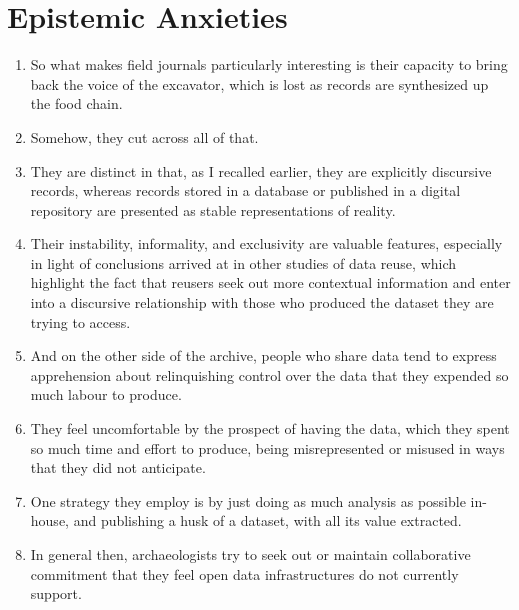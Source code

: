 \documentclass[12pt]{article}
\begin{document}
\section{Epistemic Anxieties}
\begin{enumerate}
  \item So what makes field journals particularly interesting is their capacity to bring back the voice of the excavator, which is lost as records are synthesized up the food chain.
  \item Somehow, they cut across all of that.
  \item They are distinct in that, as I recalled earlier, they are explicitly discursive records, whereas records stored in a database or published in a digital repository are presented as stable representations of reality.
  \item Their instability, informality, and exclusivity are valuable features, especially in light of conclusions arrived at in other studies of data reuse, which highlight the fact that reusers seek out more contextual information and enter into a discursive relationship with those who produced the dataset they are trying to access.
  \item And on the other side of the archive, people who share data tend to express apprehension about relinquishing control over the data that they expended so much labour to produce.
  \item They feel uncomfortable by the prospect of having the data, which they spent so much time and effort to produce, being misrepresented or misused in ways that they did not anticipate.
  \item One strategy they employ is by just doing as much analysis as possible in-house, and publishing a husk of a dataset, with all its value extracted.
  \item In general then, archaeologists try to seek out or maintain collaborative commitment that they feel open data infrastructures do not currently support.
\end{enumerate}
\end{document}
